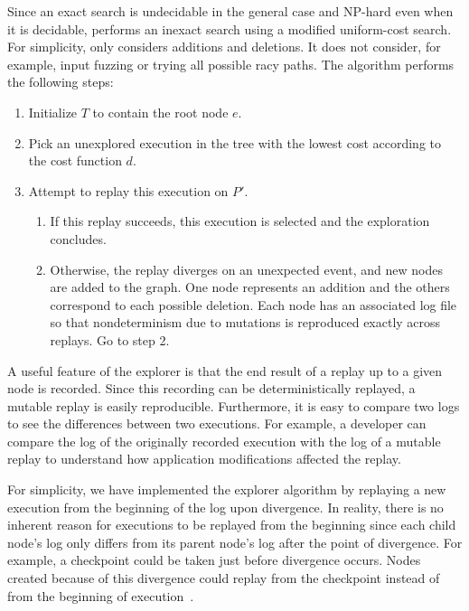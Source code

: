 Since an exact search is undecidable in the general case and NP-hard
even when it is decidable, {\dora} performs an inexact search using
a modified uniform-cost search.  For simplicity, {\dora} only
considers additions and deletions.  It does not consider, for example,
input fuzzing or trying all possible racy paths. The algorithm
performs the following steps: 

\begin{enumerate}
  \item{Initialize $T$ to contain the root node $e$.}
  \item{Pick an unexplored execution in the tree with the lowest cost according
	to the cost function $d$.}
  \item{Attempt to replay this execution on $P'$.}
  \begin{enumerate}
    \item{If this replay succeeds, this execution is selected and the exploration
	concludes.}
    \item{Otherwise, the replay diverges on an unexpected event, and new
	nodes are added to the graph. One node represents an addition
        and the others correspond to each possible deletion.
        Each node has an associated log
        file so that nondeterminism due to mutations is reproduced
        exactly across replays. Go to step 2.}
  \end{enumerate}
\end{enumerate}

A useful feature of the explorer is that the end result of a
replay up to a given node is recorded. Since this recording can be
deterministically replayed, a mutable replay is easily reproducible.
Furthermore, it is easy to compare two logs to see the differences
between two executions.  For example, a
developer can compare the log of the originally recorded execution with the log of
a mutable replay to understand how application modifications affected the
replay.

For simplicity, we have implemented the explorer algorithm by
replaying a new execution from the beginning of the log upon divergence.
In reality, there is no inherent reason for executions to be replayed from the
beginning since each child node's log only differs from its parent node's log
after the point of divergence. For example, a checkpoint could be taken just
before divergence occurs. Nodes created because of this divergence could
replay from the checkpoint instead of from the beginning of
execution~\cite{dejaview,zap07,zap02}.

